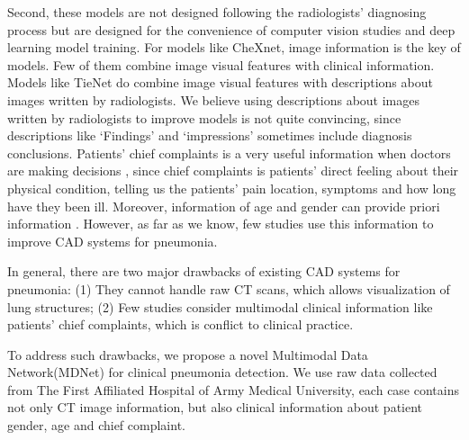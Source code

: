 \documentclass[journal]{IEEEtran}
\begin{document}
Second, these models are not designed following the radiologists' diagnosing process but are designed for the convenience of computer vision studies and deep learning model training. For models like CheXnet, image information is the key of models. Few of them combine image visual features with clinical information. Models like TieNet do combine image visual features with descriptions about images written by radiologists. We believe using descriptions about images written by radiologists to improve models is not quite convincing, since descriptions like `Findings' and `impressions' sometimes include diagnosis conclusions.
Patients' chief complaints is a very useful information when doctors are making decisions \cite{wu2018master}, since chief complaints is patients' direct feeling about their physical condition, telling us the patients' pain location, symptoms and how long have they been ill. Moreover, information of age and gender can provide priori information\cite{xiaojian2011analysis} \cite{huang2014design}. However, as far as we know, few studies use this information to improve CAD systems for pneumonia. 

In general, there are two major drawbacks of existing CAD systems for pneumonia: (1) They cannot handle raw CT scans, which allows visualization of lung structures; (2) Few studies consider multimodal clinical information like patients' chief complaints, which is conflict to clinical practice.

To address such drawbacks, we propose a novel Multimodal Data Network(MDNet) for clinical pneumonia detection. We use raw data collected from The First Affiliated Hospital of Army Medical University, each case contains not only CT image information, but also clinical information about patient gender, age and chief complaint. 
\end{document}
